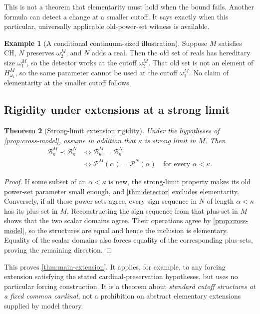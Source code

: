 \documentclass[11pt,letterpaper]{article}
\newtheorem{theorem}{Theorem}[section]
\theoremstyle{definition}
\newtheorem{example}[theorem]{Example}
\theoremstyle{remark}
\newcommand{\B}{\mathcal B}
\newcommand{\Pow}{\mathcal P}
\begin{document}
This is not a theorem that elementarity must hold when the bound fails.
Another formula can detect a change at a smaller cutoff. It says exactly
when this particular, universally applicable old-power-set witness is
available.

\begin{example}[A conditional continuum-sized illustration]
Suppose $M$ satisfies CH, $N$ preserves $\omega_2^M$, and $N$ adds a real.
Then the old set of reals has hereditary size $\omega_1^M$, so the detector
works at the cutoff $\omega_2^M$. That old set is not an element of
$H_{\omega_1}^M$, so the same parameter cannot be used at the cutoff
$\omega_1^M$. No claim of elementarity at the smaller cutoff follows.
\end{example}

\subsection{Rigidity under extensions at a strong limit}

\begin{theorem}[Strong-limit extension rigidity]
\label{thm:extension-rigidity}
Under the hypotheses of \cref{prop:cross-model}, assume in addition that
$\kappa$ is strong limit in $M$. Then
\begin{align*}
 \B_\kappa^M\prec\B_\kappa^N
 &\iff \B_\kappa^M=\B_\kappa^N\\
 &\iff \Pow^M(\alpha)=\Pow^N(\alpha)
                 \quad\text{for every }\alpha<\kappa.
\end{align*}
\end{theorem}
\begin{proof}
If some subset of an $\alpha<\kappa$ is new, the strong-limit property
makes its old power-set parameter small enough, and \cref{thm:detector}
excludes elementarity. Conversely, if all these power sets agree, every
sign sequence in $N$ of length $\alpha<\kappa$ has its plus-set in $M$.
Reconstructing the sign sequence from that plus-set in $M$ shows that the
two scalar domains agree. Their operations agree by
\cref{prop:cross-model}, so the structures are equal and hence the
inclusion is elementary. Equality of the scalar domains also forces
equality of the corresponding plus-sets, proving the remaining direction.
\end{proof}

This proves \cref{thm:main-extension}. It applies, for example, to any
forcing extension satisfying the stated cardinal-preservation hypotheses,
but uses no particular forcing construction. It is a theorem about
\emph{standard cutoff structures at a fixed common cardinal}, not a
prohibition on abstract elementary extensions supplied by model theory.
\end{document}
